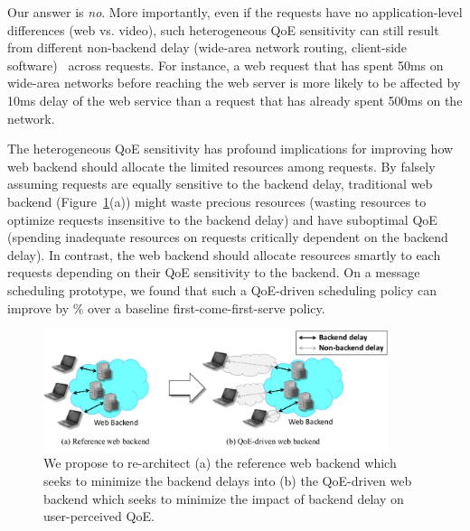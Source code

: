 Our answer is {\em no}.  More importantly, even if the requests have no application-level differences (\eg web vs. video), such heterogeneous QoE sensitivity can still result from different non-backend delay (\eg wide-area network routing, client-side software)~\cite{timecard,dqbarge} across requests.
For instance, a web request that has spent 50ms on wide-area networks before reaching the web server is more likely to be affected by 10ms delay of the web service than a request that has already spent 500ms on the network. 

The heterogeneous QoE sensitivity has profound implications for improving how web backend should allocate the limited resources among requests. 
By falsely assuming requests are equally sensitive to the backend delay, traditional web backend (Figure~\ref{fig:intro-overview}(a)) might waste precious resources (\eg wasting resources to optimize requests insensitive to the backend delay) and have suboptimal QoE (\eg spending inadequate resources on requests critically dependent on the backend delay). 
In contrast, the web backend should allocate resources smartly to each requests depending on their QoE sensitivity to the backend. 
On a message scheduling prototype, we found that such a QoE-driven scheduling policy can improve \fillme by \fillme\% over a baseline first-come-first-serve policy.

\begin{figure}[t]
	\centering
	\vspace{-0.5cm}
	\hspace{0.6cm}
	\includegraphics[width=0.9\textwidth]{figs/intro-overview.pdf}
	\vspace{-0.3cm}
	\caption{We propose to re-architect (a) the reference web backend which seeks to minimize the backend delays into (b) the QoE-driven web backend which seeks to minimize the impact of backend delay on user-perceived QoE.}
	\label{fig:intro-overview}
\end{figure}

